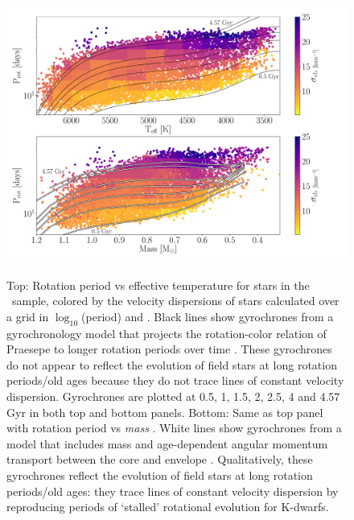 \begin{figure}
  \caption{
    Top: Rotation period vs effective temperature for stars in the \mct\
    sample, colored by the velocity dispersions of stars calculated over a
    grid in $\log_{10}$(period) and \teff.
    Black lines show gyrochrones from a gyrochronology model that projects the
    rotation-color relation of
    Praesepe to longer rotation periods over time \citep{angus2019}.
    These gyrochrones do not appear to reflect the evolution of field stars at
    long rotation periods/old ages because they do not trace lines of constant
    velocity dispersion.
    Gyrochrones are plotted at 0.5, 1, 1.5, 2, 2.5, 4 and 4.57 Gyr in both top
    and bottom panels.
    Bottom: Same as top panel with rotation period vs {\it mass}
    \citep[from][]{berger2020}.
    White lines show gyrochrones from a model that includes mass and
    age-dependent angular momentum transport between the core and envelope
    \citep{spada2019}.
    Qualitatively, these gyrochrones reflect the evolution of field
    stars at long rotation periods/old ages: they trace lines of constant
    velocity dispersion by reproducing periods of `stalled' rotational
    evolution for K-dwarfs.
}
  \centering
    \includegraphics[width=1\textwidth]{main_figure}
\label{fig:vplot}
\end{figure}

